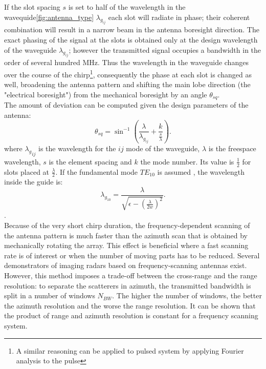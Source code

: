 If the slot spacing $s$ is set to  half of the wavelength in the wavequide\autoref{fig:antenna_type} $\lambda_{g_{ij}}$\cite{kraus88} each slot will radiate in phase; their coherent combination will result in a narrow beam in the antenna boresight direction. The exact phasing of the signal at the slots is obtained only at the design wavelength of the waveguide $\lambda_{g_{ij}}$; however the transmitted signal occupies a bandwidth in the order of several hundred MHz. Thus the wavelength in the waveguide changes over the course of the chirp\footnote{A similar reasoning can be applied to pulsed system by applying Fourier analysis to the pulse\cite{Sarkar1989}}, consequently the phase at each slot is changed as well, broadening the antenna pattern and shifting the main lobe direction (the "electrical boresight") from the mechanical boresight by an angle $\theta_{sq}$.\\
The amount of deviation can be computed given the design parameters of the antenna:
\begin{equation}\label{eq:squint_exact}
	\theta_{sq} = \sin^{-1}\left({\frac{\lambda}{\lambda_{g_{ij}}} + \frac{k}{\frac{s}{\lambda}}}\right).
\end{equation}
where ${\lambda_g}_{ij}$ is the wavelength for the $ij$ mode of the waveguide, $\lambda$ is the freespace wavelength, $s$ is the element spacing and $k$ the mode number. Its value is $\frac{1}{2}$ for slots placed at $\frac{\lambda}{2}$.
If the fundamental mode $TE_{10}$ is assumed , the wavelength inside the guide is:
\begin{equation}
\lambda_{g_{10}} = \frac{\lambda}{\sqrt{\epsilon - \left(\frac{\lambda}{2w}\right)^2 }}.
\end{equation}.\\
Because of the very short chirp duration, the frequency-dependent scanning of the antenna pattern is much faster than the azimuth scan that is obtained by mechanically rotating the array. This effect is beneficial where a fast scanning rate is of interest or when the number of moving parts has to be reduced. Several demonstrators of imaging radars based on frequency-scanning antennas exist\cite{Yang2014,Yang2012,Mayer2003,Alvarez2013}. However, this method imposes a trade-off between the cross-range and the range resolution: to separate the scatterers in azimuth, the transmitted bandwidth is split in a number of windows $N_{BW}$. The higher the number of windows, the better the azimuth resolution and the worse the range resolution\cite{Alvarez2013}. It can be shown\cite{Mayer2003} that the product of range and azimuth resolution is constant for a frequency scanning system.\\
